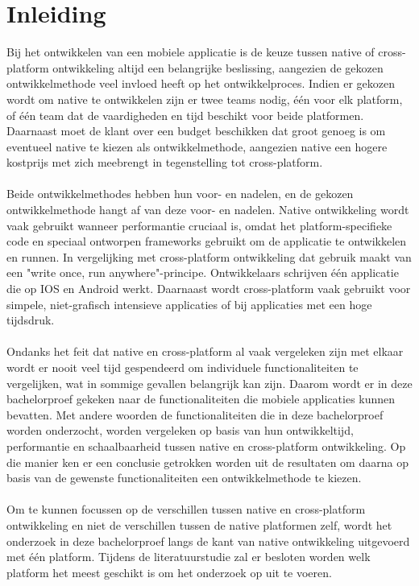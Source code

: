 
\chapter{Inleiding}
\label{ch:inleiding}

Bij het ontwikkelen van een mobiele applicatie is de keuze tussen native of cross-platform ontwikkeling altijd een belangrijke beslissing,
aangezien de gekozen ontwikkelmethode veel invloed heeft op het ontwikkelproces. 
Indien er gekozen wordt om native te ontwikkelen zijn er twee teams nodig, één voor elk platform, of één team dat de vaardigheden 
en tijd beschikt voor beide platformen. 
Daarnaast moet de klant over een budget beschikken dat groot genoeg is om eventueel native te kiezen als ontwikkelmethode, 
aangezien native een hogere kostprijs met zich meebrengt in tegenstelling tot cross-platform.
\\\\
Beide ontwikkelmethodes hebben hun voor- en nadelen, en de gekozen ontwikkelmethode hangt af van deze voor- en nadelen. 
Native ontwikkeling wordt vaak gebruikt wanneer performantie cruciaal is, 
omdat het platform-specifieke code en speciaal ontworpen frameworks gebruikt om de applicatie te ontwikkelen en runnen. 
In vergelijking met cross-platform ontwikkeling dat gebruik maakt van een "write once, run anywhere"-principe. 
Ontwikkelaars schrijven één applicatie die op IOS en Android werkt. 
Daarnaast wordt cross-platform vaak gebruikt voor simpele, niet-grafisch intensieve applicaties of bij applicaties met een hoge tijdsdruk.
\\\\
Ondanks het feit dat native en cross-platform al vaak vergeleken zijn met elkaar wordt er nooit veel tijd gespendeerd om 
individuele functionaliteiten te vergelijken, wat in sommige gevallen belangrijk kan zijn.
Daarom wordt er in deze bachelorproef gekeken naar de functionaliteiten 
die mobiele applicaties kunnen bevatten. Met andere woorden de functionaliteiten die in deze bachelorproef worden onderzocht,
worden vergeleken op basis van hun ontwikkeltijd, performantie en schaalbaarheid tussen native en cross-platform ontwikkeling.
Op die manier ken er een conclusie getrokken worden uit de resultaten om daarna op basis van de gewenste functionaliteiten een ontwikkelmethode te kiezen.
\\\\
Om te kunnen focussen op de verschillen tussen native en cross-platform ontwikkeling en niet de verschillen tussen de native platformen zelf,
wordt het onderzoek in deze bachelorproef langs de kant van native ontwikkeling uitgevoerd met één platform. 
Tijdens de literatuurstudie zal er besloten worden welk platform het meest geschikt is om het onderzoek op uit te voeren. 



